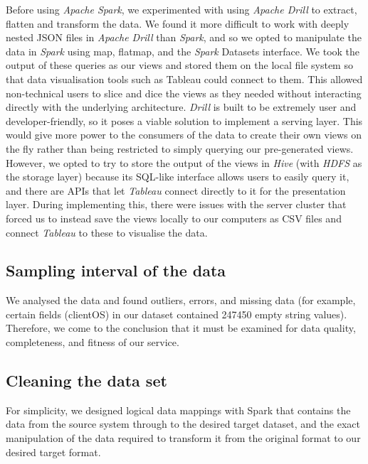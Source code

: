\documentclass[format=acmsmall, review=false, screen=true]{acmart}
\begin{document}
Before using \textit{Apache Spark}, we experimented with using \textit{Apache Drill} to extract, flatten and transform the data. We found it more difficult to work with deeply nested JSON files in \textit{Apache Drill} than \textit{Spark}, and so we opted to manipulate the data in \textit{Spark} using map, flatmap, and the \textit{Spark} Datasets interface. We took the output of these queries as our views and stored them on the local file system so that data visualisation tools such as Tableau could connect to them. This allowed non-technical users to slice and dice the views as they needed without interacting directly with the underlying architecture. \textit{Drill} is built to be extremely user and developer-friendly, so it poses a viable solution to implement a serving layer. This would give more power to the consumers of the data to create their own views on the fly rather than being restricted to simply querying our pre-generated views. However, we opted to try to store the output of the views in \textit{Hive} (with \textit{HDFS} as the storage layer) because its SQL-like interface allows users to easily query it, and there are APIs that let \textit{Tableau} connect directly to it for the presentation layer. During implementing this, there were issues with the server cluster that forced us to instead save the views locally to our computers as CSV files and connect \textit{Tableau} to these to visualise the data.

\subsection{Sampling interval of the data}

We analysed the data and found outliers, errors, and missing data (for example, certain fields (clientOS) in our dataset contained 247450 empty string values). Therefore, we come to the conclusion that it must be examined for data quality, completeness, and fitness of our service. 

\subsection{Cleaning the data set}

For simplicity, we designed logical data mappings with Spark that contains the data from the source system through to the desired target dataset, and the exact manipulation of the data required to transform it from the original format to our desired target format. 
\end{document}
